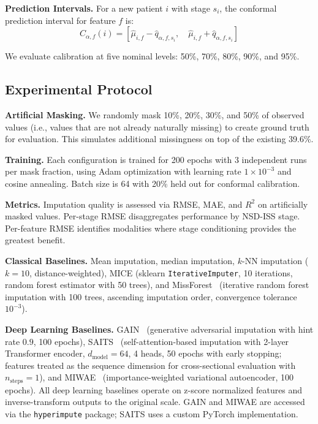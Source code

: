 \textbf{Prediction Intervals.} For a new patient $i$ with stage $s_i$, the conformal prediction interval for feature $f$ is:
\begin{equation}
C_{\alpha,f}(i) = [\hat{\mu}_{i,f} - \hat{q}_{\alpha,f,s_i}, \quad \hat{\mu}_{i,f} + \hat{q}_{\alpha,f,s_i}]
\label{p2:eq:interval}
\end{equation}

We evaluate calibration at five nominal levels: 50\%, 70\%, 80\%, 90\%, and 95\%.

\subsection{Experimental Protocol}
\label{p2:sec:protocol}

\textbf{Artificial Masking.} We randomly mask 10\%, 20\%, 30\%, and 50\% of observed values (i.e., values that are not already naturally missing) to create ground truth for evaluation. This simulates additional missingness on top of the existing 39.6\%.

\textbf{Training.} Each configuration is trained for 200 epochs with 3 independent runs per mask fraction, using Adam optimization with learning rate $1 \times 10^{-3}$ and cosine annealing. Batch size is 64 with 20\% held out for conformal calibration.

\textbf{Metrics.} Imputation quality is assessed via RMSE, MAE, and $R^2$ on artificially masked values. Per-stage RMSE disaggregates performance by NSD-ISS stage. Per-feature RMSE identifies modalities where stage conditioning provides the greatest benefit.

\textbf{Classical Baselines.} Mean imputation, median imputation, $k$-NN imputation ($k = 10$, distance-weighted), MICE (sklearn \texttt{IterativeImputer}, 10 iterations, random forest estimator with 50 trees), and MissForest~\cite{stekhoven2012} (iterative random forest imputation with 100 trees, ascending imputation order, convergence tolerance $10^{-3}$).

\textbf{Deep Learning Baselines.} GAIN~\cite{yoon2018} (generative adversarial imputation with hint rate $0.9$, 100 epochs), SAITS~\cite{du2023} (self-attention-based imputation with 2-layer Transformer encoder, $d_{\text{model}} = 64$, 4 heads, 50 epochs with early stopping; features treated as the sequence dimension for cross-sectional evaluation with $n_{\text{steps}} = 1$), and MIWAE~\cite{mattei2019} (importance-weighted variational autoencoder, 100 epochs). All deep learning baselines operate on z-score normalized features and inverse-transform outputs to the original scale. GAIN and MIWAE are accessed via the \texttt{hyperimpute} package; SAITS uses a custom PyTorch implementation.

